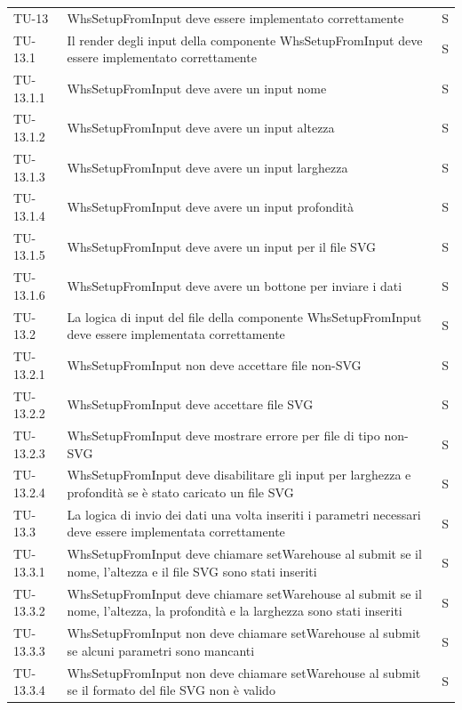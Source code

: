 \begin{xltabular}{0.9\textwidth}{X | p{0.6\textwidth} | p{0.1\textwidth} }
    TU-13 & WhsSetupFromInput deve essere implementato correttamente & S\\
    TU-13.1 & Il render degli input della componente WhsSetupFromInput deve essere implementato correttamente & S\\
    TU-13.1.1 & WhsSetupFromInput deve avere un input nome & S\\
    TU-13.1.2 & WhsSetupFromInput deve avere un input altezza & S\\
    TU-13.1.3 & WhsSetupFromInput deve avere un input larghezza & S\\
    TU-13.1.4 & WhsSetupFromInput deve avere un input profondità & S\\
    TU-13.1.5 & WhsSetupFromInput deve avere un input per il file SVG & S\\
    TU-13.1.6 & WhsSetupFromInput deve avere un bottone per inviare i dati & S\\
    TU-13.2 & La logica di input del file della componente WhsSetupFromInput deve essere implementata correttamente & S\\
    TU-13.2.1 & WhsSetupFromInput non deve accettare file non-SVG & S\\
    TU-13.2.2 & WhsSetupFromInput deve accettare file SVG & S\\
    TU-13.2.3 & WhsSetupFromInput deve mostrare errore per file di tipo non-SVG & S\\
    TU-13.2.4 & WhsSetupFromInput deve disabilitare gli input per larghezza e profondità se è stato caricato un file SVG & S\\
    TU-13.3 & La logica di invio dei dati una volta inseriti i parametri necessari deve essere implementata correttamente & S\\
    TU-13.3.1 & WhsSetupFromInput deve chiamare setWarehouse al submit se il nome, l'altezza e il file SVG sono stati inseriti & S\\
    TU-13.3.2 & WhsSetupFromInput deve chiamare setWarehouse al submit se il nome, l'altezza, la profondità e la larghezza sono stati inseriti & S\\
    TU-13.3.3 & WhsSetupFromInput non deve chiamare setWarehouse al submit se alcuni parametri sono mancanti & S\\
    TU-13.3.4 & WhsSetupFromInput non deve chiamare setWarehouse al submit se il formato del file SVG non è valido & S\\


\end{xltabular}
